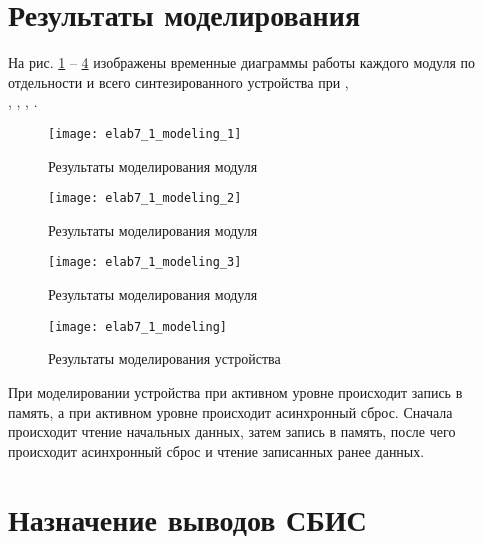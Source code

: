 \section{Результаты моделирования}
\label{sec:elab7_1_modeling}

На рис. \ref{fig:elab7_1_modeling_1} -- \ref{fig:elab7_1_modeling} изображены временные диаграммы работы каждого модуля по отдельности и всего синтезированного устройства при ,\\ , , , .

\begin{figure}[H]
\begin{center}
	\texttt{[image: elab7\_1\_modeling\_1]}
	\caption{Результаты моделирования модуля }
	\label{fig:elab7_1_modeling_1}
\end{center}
\end{figure}

\begin{figure}[H]
\begin{center}
	\texttt{[image: elab7\_1\_modeling\_2]}
	\caption{Результаты моделирования модуля }
	\label{fig:elab7_1_modeling_2}
\end{center}
\end{figure}

\begin{figure}[H]
\begin{center}
	\texttt{[image: elab7\_1\_modeling\_3]}
	\caption{Результаты моделирования модуля }
	\label{fig:elab7_1_modeling_3}
\end{center}
\end{figure}

\begin{figure}[H]
\begin{center}
	\texttt{[image: elab7\_1\_modeling]}
	\caption{Результаты моделирования устройства}
	\label{fig:elab7_1_modeling}
\end{center}
\end{figure}

При моделировании устройства при активном уровне  происходит запись в память, а при активном уровне  происходит асинхронный сброс. Сначала происходит чтение начальных данных, затем запись в память, после чего происходит асинхронный сброс и чтение записанных ранее данных.

\section{Назначение выводов СБИС}

